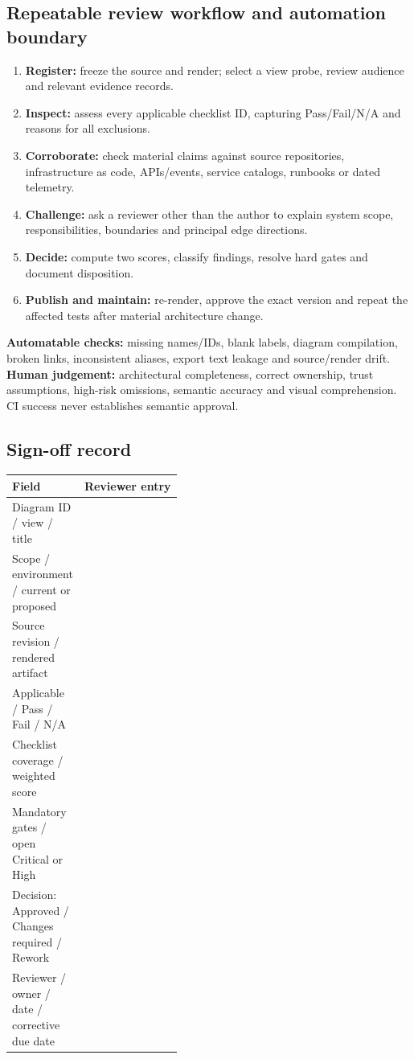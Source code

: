 \documentclass[10pt,letterpaper]{article}
\begin{document}
\subsection{Repeatable review workflow and automation boundary}
\begin{enumerate}
\item \textbf{Register:} freeze the source and render; select a view probe, review audience and relevant evidence records.
\item \textbf{Inspect:} assess every applicable checklist ID, capturing Pass/Fail/N/A and reasons for all exclusions.
\item \textbf{Corroborate:} check material claims against source repositories, infrastructure as code, APIs/events, service catalogs, runbooks or dated telemetry.
\item \textbf{Challenge:} ask a reviewer other than the author to explain system scope, responsibilities, boundaries and principal edge directions.
\item \textbf{Decide:} compute two scores, classify findings, resolve hard gates and document disposition.
\item \textbf{Publish and maintain:} re-render, approve the exact version and repeat the affected tests after material architecture change.
\end{enumerate}
\textbf{Automatable checks:} missing names/IDs, blank labels, diagram compilation, broken links, inconsistent aliases, export text leakage and source/render drift. \textbf{Human judgement:} architectural completeness, correct ownership, trust assumptions, high-risk omissions, semantic accuracy and visual comprehension. CI success never establishes semantic approval.

\subsection{Sign-off record}
\begin{tabularx}{\linewidth}{@{}>{\raggedright\arraybackslash}p{0.42\linewidth}Y@{}}
\toprule\textbf{Field} & \textbf{Reviewer entry}\\\midrule
Diagram ID / view / title & \rule{0pt}{17pt}\\
Scope / environment / current or proposed & \rule{0pt}{17pt}\\
Source revision / rendered artifact & \rule{0pt}{17pt}\\
Applicable / Pass / Fail / N/A & \rule{0pt}{17pt}\\
Checklist coverage / weighted score & \rule{0pt}{17pt}\\
Mandatory gates / open Critical or High & \rule{0pt}{17pt}\\
Decision: Approved / Changes required / Rework & \rule{0pt}{17pt}\\
Reviewer / owner / date / corrective due date & \rule{0pt}{17pt}\\
\bottomrule
\end{tabularx}
\end{document}
